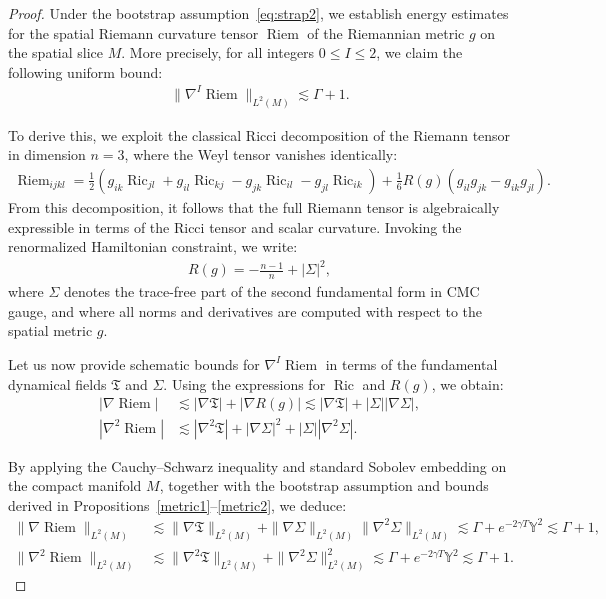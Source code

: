 \documentclass{amsart}
\begin{document}
\begin{proof}
\noindent
Under the bootstrap assumption~\eqref{eq:strap2}, we establish energy estimates for the spatial Riemann curvature tensor $\operatorname{Riem}$ of the Riemannian metric $g$ on the spatial slice $M$. More precisely, for all integers $0 \leq I \leq 2$, we claim the following uniform bound:
\begin{align} \label{eq:Riem_bound_claim}
    \|\nabla^I \operatorname{Riem} \|_{L^2(M)} \lesssim \Gamma + 1.
\end{align}

\noindent
To derive this, we exploit the classical Ricci decomposition of the Riemann tensor in dimension $n = 3$, where the Weyl tensor vanishes identically:
\begin{align}
    \operatorname{Riem}_{ijkl} = \tfrac{1}{2} \left( g_{ik} \operatorname{Ric}_{jl} + g_{il} \operatorname{Ric}_{kj} - g_{jk} \operatorname{Ric}_{il} - g_{jl} \operatorname{Ric}_{ik} \right) 
    + \tfrac{1}{6} R(g) \left( g_{il} g_{jk} - g_{ik} g_{jl} \right).
\end{align}
\noindent
From this decomposition, it follows that the full Riemann tensor is algebraically expressible in terms of the Ricci tensor and scalar curvature. Invoking the renormalized Hamiltonian constraint, we write:
\begin{align}
    R(g) = -\tfrac{n-1}{n} + |\Sigma|^2,
\end{align}
\noindent
where $\Sigma$ denotes the trace-free part of the second fundamental form in CMC gauge, and where all norms and derivatives are computed with respect to the spatial metric $g$.

\vspace{1ex}
\noindent
Let us now provide schematic bounds for $\nabla^I \operatorname{Riem}$ in terms of the fundamental dynamical fields $\mathfrak{T}$ and $\Sigma$. Using the expressions for $\operatorname{Ric}$ and $R(g)$, we obtain:
\begin{align}
    |\nabla \operatorname{Riem}| 
    &\lesssim |\nabla \mathfrak{T}| + |\nabla R(g)| 
    \lesssim |\nabla \mathfrak{T}| + |\Sigma||\nabla \Sigma|, \\
    |\nabla^2 \operatorname{Riem}| 
    &\lesssim |\nabla^2 \mathfrak{T}| + |\nabla \Sigma|^2 + |\Sigma||\nabla^2 \Sigma|.
\end{align}

\noindent
By applying the Cauchy–Schwarz inequality and standard Sobolev embedding on the compact manifold $M$, together with the bootstrap assumption and bounds derived in Propositions~\ref{metric1}--\ref{metric2}, we deduce:
\begin{align}
    \| \nabla \operatorname{Riem} \|_{L^2(M)} 
    &\lesssim \| \nabla \mathfrak{T} \|_{L^2(M)} 
    + \| \nabla \Sigma \|_{L^2(M)} \| \nabla^2 \Sigma \|_{L^2(M)} 
    \lesssim \Gamma + e^{-2\gamma T} \mathds{Y}^2 
    \lesssim \Gamma + 1, \\
    \| \nabla^2 \operatorname{Riem} \|_{L^2(M)} 
    &\lesssim \| \nabla^2 \mathfrak{T} \|_{L^2(M)} + \| \nabla^2 \Sigma \|_{L^2(M)}^2 
    \lesssim \Gamma + e^{-2\gamma T} \mathds{Y}^2 
    \lesssim \Gamma + 1.
\end{align}


\end{proof}
\end{document}
